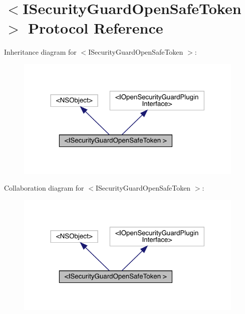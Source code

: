 \hypertarget{protocol_i_security_guard_open_safe_token_01-p}{}\section{$<$I\+Security\+Guard\+Open\+Safe\+Token $>$ Protocol Reference}
\label{protocol_i_security_guard_open_safe_token_01-p}


Inheritance diagram for $<$I\+Security\+Guard\+Open\+Safe\+Token $>$\+:\nopagebreak
\begin{figure}[H]
\begin{center}
\leavevmode
\includegraphics[width=310pt]{protocol_i_security_guard_open_safe_token_01-p__inherit__graph}
\end{center}
\end{figure}


Collaboration diagram for $<$I\+Security\+Guard\+Open\+Safe\+Token $>$\+:\nopagebreak
\begin{figure}[H]
\begin{center}
\leavevmode
\includegraphics[width=310pt]{protocol_i_security_guard_open_safe_token_01-p__coll__graph}
\end{center}
\end{figure}
